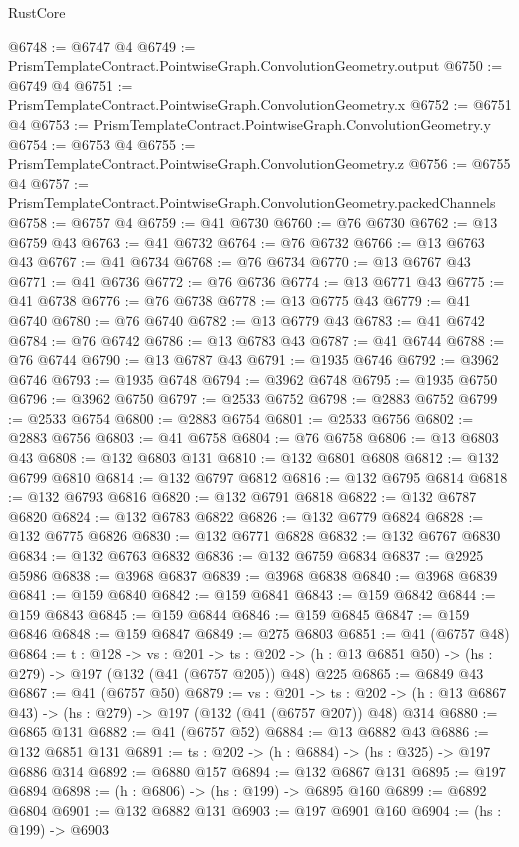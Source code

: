 \begin{lexlean}{RustCore}
\begin{coremodule}
@6748 := @6747 @4
@6749 := PrismTemplateContract.PointwiseGraph.ConvolutionGeometry.output
@6750 := @6749 @4
@6751 := PrismTemplateContract.PointwiseGraph.ConvolutionGeometry.x
@6752 := @6751 @4
@6753 := PrismTemplateContract.PointwiseGraph.ConvolutionGeometry.y
@6754 := @6753 @4
@6755 := PrismTemplateContract.PointwiseGraph.ConvolutionGeometry.z
@6756 := @6755 @4
@6757 := PrismTemplateContract.PointwiseGraph.ConvolutionGeometry.packedChannels
@6758 := @6757 @4
@6759 := @41 @6730
@6760 := @76 @6730
@6762 := @13 @6759 @43
@6763 := @41 @6732
@6764 := @76 @6732
@6766 := @13 @6763 @43
@6767 := @41 @6734
@6768 := @76 @6734
@6770 := @13 @6767 @43
@6771 := @41 @6736
@6772 := @76 @6736
@6774 := @13 @6771 @43
@6775 := @41 @6738
@6776 := @76 @6738
@6778 := @13 @6775 @43
@6779 := @41 @6740
@6780 := @76 @6740
@6782 := @13 @6779 @43
@6783 := @41 @6742
@6784 := @76 @6742
@6786 := @13 @6783 @43
@6787 := @41 @6744
@6788 := @76 @6744
@6790 := @13 @6787 @43
@6791 := @1935 @6746
@6792 := @3962 @6746
@6793 := @1935 @6748
@6794 := @3962 @6748
@6795 := @1935 @6750
@6796 := @3962 @6750
@6797 := @2533 @6752
@6798 := @2883 @6752
@6799 := @2533 @6754
@6800 := @2883 @6754
@6801 := @2533 @6756
@6802 := @2883 @6756
@6803 := @41 @6758
@6804 := @76 @6758
@6806 := @13 @6803 @43
@6808 := @132 @6803 @131
@6810 := @132 @6801 @6808
@6812 := @132 @6799 @6810
@6814 := @132 @6797 @6812
@6816 := @132 @6795 @6814
@6818 := @132 @6793 @6816
@6820 := @132 @6791 @6818
@6822 := @132 @6787 @6820
@6824 := @132 @6783 @6822
@6826 := @132 @6779 @6824
@6828 := @132 @6775 @6826
@6830 := @132 @6771 @6828
@6832 := @132 @6767 @6830
@6834 := @132 @6763 @6832
@6836 := @132 @6759 @6834
@6837 := @2925 @5986
@6838 := @3968 @6837
@6839 := @3968 @6838
@6840 := @3968 @6839
@6841 := @159 @6840
@6842 := @159 @6841
@6843 := @159 @6842
@6844 := @159 @6843
@6845 := @159 @6844
@6846 := @159 @6845
@6847 := @159 @6846
@6848 := @159 @6847
@6849 := @275 @6803
@6851 := @41 (@6757 @48)
@6864 := {t : @128} ->
  {vs : @201} ->
  {ts : @202} -> (h : @13 @6851 @50) -> (hs : @279) -> @197 (@132 (@41 (@6757 @205)) @48) @225
@6865 := @6849 @43
@6867 := @41 (@6757 @50)
@6879 := {vs : @201} ->
  {ts : @202} -> (h : @13 @6867 @43) -> (hs : @279) -> @197 (@132 (@41 (@6757 @207)) @48) @314
@6880 := @6865 @131
@6882 := @41 (@6757 @52)
@6884 := @13 @6882 @43
@6886 := @132 @6851 @131
@6891 := {ts : @202} -> (h : @6884) -> (hs : @325) -> @197 @6886 @314
@6892 := @6880 @157
@6894 := @132 @6867 @131
@6895 := @197 @6894
@6898 := (h : @6806) -> (hs : @199) -> @6895 @160
@6899 := @6892 @6804
@6901 := @132 @6882 @131
@6903 := @197 @6901 @160
@6904 := (hs : @199) -> @6903

\end{coremodule}
\end{lexlean}
